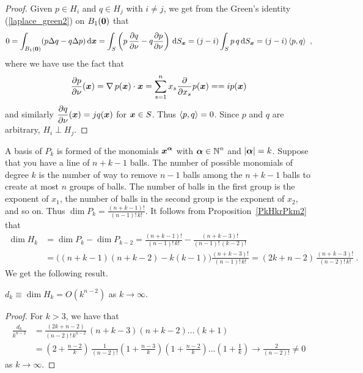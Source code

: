 \begin{proof}
Given $p\in H_i$ and $q \in H_j$ with $i \neq j$, we get from the Green's
identity (\ref{laplace_green2}) on $B_1(\VEC{0})$ that
\[
  0 = \int_{B_1(\VEC{0})} (p \Delta q - q \Delta p) \dx{\VEC{x}}
= \int_S \left( p\,\pdydx{q}{\nu} - q \pdydx{p}{\nu} \right)
\dss{S}{x} = (j - i) \int_S p\,q \dss{S}{x}
= (j-i)\ps{p}{q} \ ,
\]
where we have use the fact that
\[
 \pdydx{p}{\nu}(\VEC{x})
 = \graD p(\VEC{x}) \cdot \VEC{x}
 = \sum_{s=1}^n x_s \pdfdx{p}{x_s}(\VEC{x}) = 
 = i p(\VEC{x})
\]
and similarly $\displaystyle \pdydx{q}{\nu}(\VEC{x}) = j q(\VEC{x})$
for $\VEC{x} \in S$.  Thus $\ps{p}{q} = 0$.  Since $p$ and $q$ are
arbitrary, $H_i \perp H_j$.
\end{proof}

A basis of $P_k$ is formed of the monomials
$\displaystyle \VEC{x}^{\VEC{\alpha}}$ with
$\displaystyle \VEC{\alpha} \in \NN^n$ and $|\VEC{\alpha}| = k$.
Suppose that you have a line of $n+k-1$ balls.  The number of possible
monomials of degree $k$ is the number of way to remove $n-1$ balls among the
$n+k-1$ balls to create at most $n$ groups of balls.  The number of
balls in the first group is the exponent of $x_1$, the number of balls
in the second group is the exponent of $x_2$, and so on.  Thus
$\displaystyle \dim P_k = \frac{(n+k-1)!}{(n-1)!\,k!}$.  It follows
from Proposition~\ref{PkHkrPkm2} that
\begin{align*}
\dim H_k &= \dim P_k - \dim P_{k-2}
= \frac{(n+k-1)!}{(n-1)!\,k!} - \frac{(n+k-3)!}{(n-1)!\,(k-2)!} \\
&= \big((n+k-1)(n+k-2) - k(k-1)\big)
\frac{(n+k-3)!}{(n-1)!\,k!}
= (2k + n - 2)\, \frac{(n+k-3)!}{(n-2)!\,k!} \ .
\end{align*}
We get the following result.

\begin{prop} \label{HkOknm2}
$d_k \equiv \dim H_k = O(k^{n-2})$ as $k \to \infty$.
\end{prop}

\begin{proof}
For $k>3$, we have that
\begin{align*}
\frac{d_k}{k^{n-2}}
&= \frac{(2k + n - 2)}{(n-2)!\,k^{n-2}}\,
(n+k-3)(n+k-2)\ldots (k+1) \\
&= \left(2 + \frac{n - 2}{k}\right)\,
\frac{1}{(n-2)!}
\left(1 + \frac{n-3}{k}\right)\left(1 + \frac{n-2}{k}\right)\ldots
\left(1 + \frac{1}{k}\right) \to \frac{2}{(n-2)!} \neq 0
\end{align*}
as $k \to \infty$.
\end{proof}

